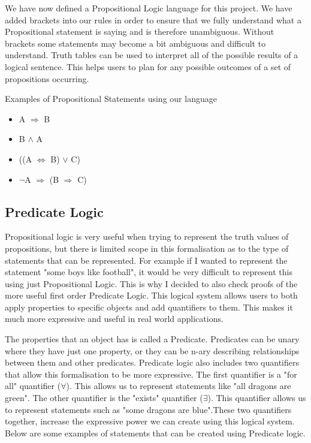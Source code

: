 We have now defined a Propositional Logic language for this project. We have added brackets into our rules in order to ensure that we fully understand what a Propositional statement is saying and is therefore unambiguous. Without brackets some statements may become a bit ambiguous and difficult to understand. Truth tables can be used to interpret all of the possible results of a logical sentence. This helps users to plan for any possible outcomes of a set of propositions occurring.

\begin{exmp}Examples of Propositional Statements using our language
\begin{itemize}
\item A $\Rightarrow$ B
\item B $\wedge$ A
\item ((A $\Leftrightarrow$ B) $\vee$ C)
\item $\neg$A $\Rightarrow$ (B $\Rightarrow$ C)
\end{itemize}
\end{exmp}


\subsection{Predicate Logic}
Propositional logic is very useful when trying to represent the truth values of propositions, but there is limited scope in this formalisation as to the type of statements that can be represented. For example if I wanted to represent the statement "some boys like football", it would be very difficult to represent this using just Propositional Logic. This is why I decided to also check proofs of the more useful first order Predicate Logic. This logical system allows users to both apply properties to specific objects and add quantifiers to them. This makes it much more expressive and useful in real world applications. 

The properties that an object has is called a Predicate. Predicates can be unary where they have just one property, or they can be n-ary describing relationships between them and other predicates. Predicate logic also includes two quantifiers that allow this formalisation to be more expressive. The first quantifier is a "for all" quantifier ($\forall$). This allows us to represent statements like "all dragons are green". The other quantifier is the "exists" quantifier ($\exists$). This quantifier allows us to represent statements such as "some dragons are blue".These two quantifiers together, increase the expressive power we can create using this logical system. Below are some examples of statements that can be created using Predicate logic.

